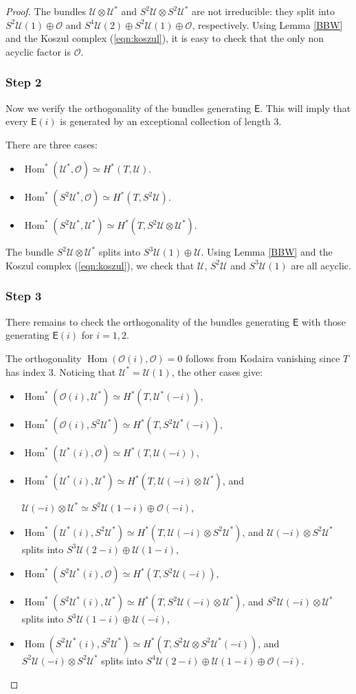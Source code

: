 \documentclass[11pt]{article}
\let\mathcal\mathscr
\theoremstyle{plain}
\theoremstyle{definition}
\newcommand{\cat}[1]{\mathsf{#1}}
\DeclareMathOperator{\Hom}{Hom}
\newcommand{\sheaf}[1]{\mathcal{#1}}
\newcommand{\ko}{\sheaf{O}}\let\OO\ko\let\cO\ko
\newcommand{\ku}{\sheaf{U}}
\begin{document}
\begin{proof}
The bundles $\ku \otimes \ku^*$ and $S^2\ku \otimes S^2\ku^*$ are not irreducible:
they split into \hbox{$S^2 \ku(1)\oplus \ko$} and $S^4 \ku (2) \oplus S^2 \ku (1)
\oplus \ko$, respectively.
Using Lemma \ref{BBW} and the Koszul complex (\ref{eqn:koszul}), it is easy to check that the only non acyclic factor is $\ko$.

\subsubsection*{Step 2}
Now we verify the orthogonality of the bundles generating $\cat{E}$. This will imply
that every $\cat{E}(i)$ is generated by an exceptional collection of length 3.

There are three cases:

\begin{itemize}
\item $\Hom^*(\ku^*,\ko) \simeq H^*(T,\ku)$.
\item $\Hom^*(S^2\ku^*,\ko) \simeq H^*(T,S^2\ku)$.
\item $\Hom^*(S^2\ku^*,\ku^*) \simeq H^*(T,S^2\ku\otimes\ku^*)$.
\end{itemize}

The bundle $S^2\ku \otimes\ku^*$ splits into $S^3 \ku (1) \oplus \ku$.
Using Lemma \ref{BBW} and the Koszul complex (\ref{eqn:koszul}), we check that $\ku$, $S^2\ku$ and $S^3 \ku (1)$ are all acyclic.

\subsubsection*{Step 3}
There remains to check the orthogonality of the bundles generating $\cat{E}$ with those generating $\cat{E}(i)$ for $i=1,2$.

The orthogonality $\Hom(\ko(i),\ko)=0$ follows from Kodaira vanishing since $T$ has index 3. Noticing that $\ku^*=\ku(1)$, the other cases give:

\begin{itemize}
\item $\Hom^*(\ko(i),\ku^*) \simeq H^*(T,\ku^*(-i))$,
\item $\Hom^*(\ko(i),S^2\ku^*) \simeq H^*(T,S^2\ku^*(-i))$,
\item $\Hom^*(\ku^*(i),\ko) \simeq H^*(T,\ku(-i))$,
\item $\Hom^*(\ku^*(i),\ku^*) \simeq H^*(T,\ku(-i) \otimes \ku^*)$, and\par\noindent$\ku(-i) \otimes \ku^* \simeq S^2 \ku (1-i) \oplus \ko(-i)$,
\item $\Hom^*(\ku^*(i),S^2\ku^*) \simeq H^*(T,\ku(-i) \otimes S^2\ku^*)$, and $\ku(-i) \otimes S^2\ku^*$ splits into $S^3 \ku(2-i)\oplus \ku (1-i)$,
\item $\Hom^*(S^2\ku^*(i),\ko) \simeq H^*(T,S^2\ku(-i))$,
\item $\Hom^*(S^2\ku^*(i),\ku^*) \simeq H^*(T,S^2\ku(-i) \otimes \ku^*)$, and $S^2\ku(-i) \otimes \ku^*$ splits into $S^3\ku (1-i) \oplus \ku(-i)$,
\item $\Hom(S^2\ku^*(i),S^2\ku^*) \simeq H^*(T,S^2\ku \otimes S^2 \ku^* (-i))$, and $S^2\ku(-i) \otimes S^2\ku^*$ splits into $S^4\ku (2-i)\oplus \ku(1-i)\oplus \ko(-i)$.
\end{itemize}


\end{proof}
\end{document}
